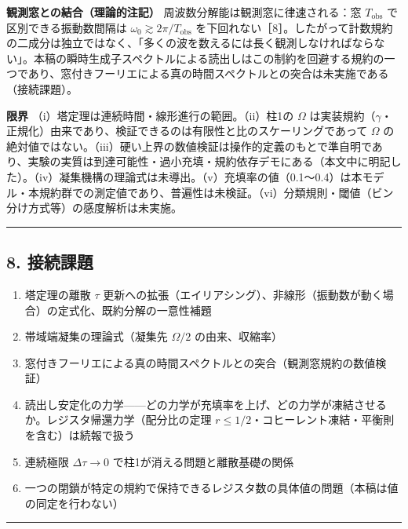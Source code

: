 \documentclass[
  a4paper,
]{ltjsarticle}
\providecommand{\tightlist}{%
  \setlength{\itemsep}{0pt}\setlength{\parskip}{0pt}}
\begin{document}
\textbf{観測窓との結合（理論的注記）}
周波数分解能は観測窓に律速される：窓 \(T_{\mathrm{obs}}\)
で区別できる振動数間隔は \(\omega_0\gtrsim2\pi/T_{\mathrm{obs}}\)
を下回れない［8］。したがって計数規約の二成分は独立ではなく、「多くの波を数えるには長く観測しなければならない」。本稿の瞬時生成子スペクトルによる読出しはこの制約を回避する規約の一つであり、窓付きフーリエによる真の時間スペクトルとの突合は未実施である（接続課題）。

\textbf{限界} （i）塔定理は連続時間・線形進行の範囲。（ii）柱1の
\(\Omega\)
は実装規約（\(\gamma\)・正規化）由来であり、検証できるのは有限性と比のスケーリングであって
\(\Omega\)
の絶対値ではない。（iii）硬い上界の数値検証は操作的定義のもとで準自明であり、実験の実質は到達可能性・過小充填・規約依存デモにある（本文中に明記した）。（iv）凝集機構の理論式は未導出。（v）充填率の値（0.1〜0.4）は本モデル・本規約群での測定値であり、普遍性は未検証。（vi）分類規則・閾値（ビン分け方式等）の感度解析は未実施。

\begin{center}\rule{0.5\linewidth}{0.5pt}\end{center}

\subsection{8. 接続課題}\label{ux63a5ux7d9aux8ab2ux984c}

\begin{enumerate}
\def\labelenumi{\arabic{enumi}.}
\tightlist
\item
  塔定理の離散 \(\tau\)
  更新への拡張（エイリアシング）、非線形（振動数が動く場合）の定式化、既約分解の一意性補題
\item
  帯域端凝集の理論式（凝集先 \(\Omega/2\) の由来、収縮率）
\item
  窓付きフーリエによる真の時間スペクトルとの突合（観測窓規約の数値検証）
\item
  読出し安定化の力学------どの力学が充填率を上げ、どの力学が凍結させるか。レジスタ帰還力学（配分比の定理
  \(r\le1/2\)・コヒーレント凍結・平衡則を含む）は続報で扱う
\item
  連続極限 \(\Delta\tau\to0\) で柱1が消える問題と離散基礎の関係
\item
  一つの閉鎖が特定の規約で保持できるレジスタ数の具体値の問題（本稿は値の同定を行わない）
\end{enumerate}

\begin{center}\rule{0.5\linewidth}{0.5pt}\end{center}
\end{document}
